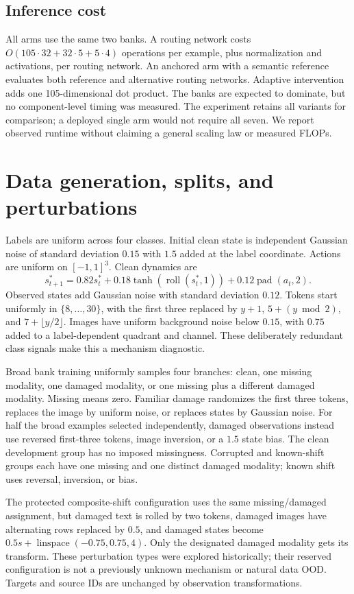 \subsection{Inference cost}
All arms use the same two banks. A routing network costs
$O(105\cdot32+32\cdot5+5\cdot4)$ operations per example, plus normalization
and activations, per routing network. An anchored arm with a semantic reference
evaluates both reference and alternative routing networks. Adaptive intervention
adds one 105-dimensional dot product. The banks are expected to dominate, but
no component-level timing was measured. The experiment retains all variants
for comparison; a deployed single arm would not require all seven. We report
observed runtime without claiming a general scaling law or measured FLOPs.

\section{Data generation, splits, and perturbations}
Labels are uniform across four classes. Initial clean state is independent
Gaussian noise of standard deviation $0.15$ with $1.5$ added at the label
coordinate. Actions are uniform on $[-1,1]^3$. Clean dynamics are
\begin{equation}
 s^*_{t+1}=0.82s^*_t+0.18\tanh(\operatorname{roll}(s^*_t,1))
 +0.12\operatorname{pad}(a_t,2).
\end{equation}
Observed states add Gaussian noise with standard deviation $0.12$. Tokens start
uniformly in $\{8,\ldots,30\}$, with the first three replaced by
$y+1$, $5+(y\bmod2)$, and $7+\lfloor y/2\rfloor$. Images have uniform background
noise below $0.15$, with $0.75$ added to a label-dependent quadrant and channel.
These deliberately redundant class signals make this a mechanism diagnostic.

Broad bank training uniformly samples four branches: clean, one missing
modality, one damaged modality, or one missing plus a different damaged
modality. Missing means zero. Familiar damage randomizes the first three
tokens, replaces the image by uniform noise, or replaces states by Gaussian
noise. For half the broad examples selected independently, damaged observations
instead use reversed first-three tokens, image inversion, or a $1.5$ state bias.
The clean development group has no imposed missingness. Corrupted and known-shift
groups each have one missing and one distinct damaged modality; known shift
uses reversal, inversion, or bias.

The protected composite-shift configuration uses the same missing/damaged
assignment, but damaged text is rolled by two tokens, damaged images have
alternating rows replaced by $0.5$, and damaged states become
$0.5s+\operatorname{linspace}(-0.75,0.75,4)$. Only the designated damaged
modality gets its transform. These perturbation types were explored historically;
their reserved configuration is not a previously unknown mechanism or natural
data OOD. Targets and source IDs are unchanged by observation transformations.


